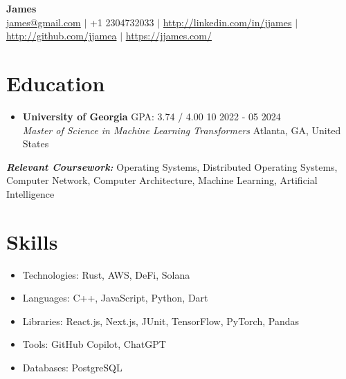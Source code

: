 \documentclass[a4paper,10pt]{article}
\begin{document}
\pagestyle{empty}

\begin{center}
    \textbf{\LARGE James} \\
    \vspace{7pt} 
    \href{mailto:james@gmail.com}{james@gmail.com} $\vert$ +1 2304732033 $\vert$ \href{https://linkedin.com/in/http://linkedin.com/in/jjames}{\faLinkedin  { } http://linkedin.com/in/jjames} $\vert$ \href{https://github.com/http://github.com/jjamea}{\faGithub { } http://github.com/jjamea} $\vert$ \href{https://https://jjames.com/}{https://jjames.com/}

\end{center}

\vspace{-20pt}
\section*{Education}
\vspace{-5pt}

\begin{itemize}
    \item \textbf{University of Georgia} GPA: 3.74 / 4.00  \hfill 10 2022 - 05 2024 \\
\textit{Master of Science in Machine Learning Transformers} \hfill Atlanta, GA, United States
 \\
\end{itemize}
\vspace{-5pt}
    \textit{\textbf{Relevant Coursework:}} Operating Systems, Distributed Operating Systems, Computer Network, Computer Architecture, Machine Learning, Artificial Intelligence

\vspace{-10pt}
\section*{Skills}
\vspace{-5pt}
\begin{itemize}
   \item Technologies: Rust, AWS, DeFi, Solana  
\item Languages: C++, JavaScript, Python, Dart  
\item Libraries: React.js, Next.js, JUnit, TensorFlow, PyTorch, Pandas  
\item Tools: GitHub Copilot, ChatGPT  
\item Databases: PostgreSQL
\end{itemize}
\end{document}
